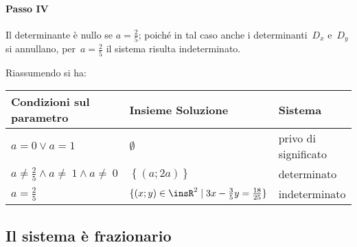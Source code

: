 \begin{exrig}
\begin{esempio}
\paragraph{Passo IV} Il determinante è nullo se
$a=\frac{2}{5}$; poiché in tal caso anche i determinanti~$D_{x}$ e~$D_{y}$ si annullano,
per~$a=\frac{2}{5}$ il sistema risulta indeterminato.

Riassumendo si ha:

\begin{center}
\begin{tabular}{lll}
\toprule
Condizioni sul parametro & Insieme Soluzione & Sistema\\
\midrule
$a=0\vee a=1$ & $\emptyset $ & privo di significato\\
$a\neq \frac{2}{5} \wedge a\neq~1 \wedge a\neq~0$ & $\left\{(a;2a)\right\}$ & determinato\\
$a=\frac{2}{5}$ & $\{(x;y)\in\insR^2\mid 3x-\frac{3}{5}y=\frac{18}{25}\}$ & indeterminato\\
\bottomrule
\end{tabular}
\end{center}
\end{esempio}
\end{exrig}
\subsection*{Il sistema è frazionario}

